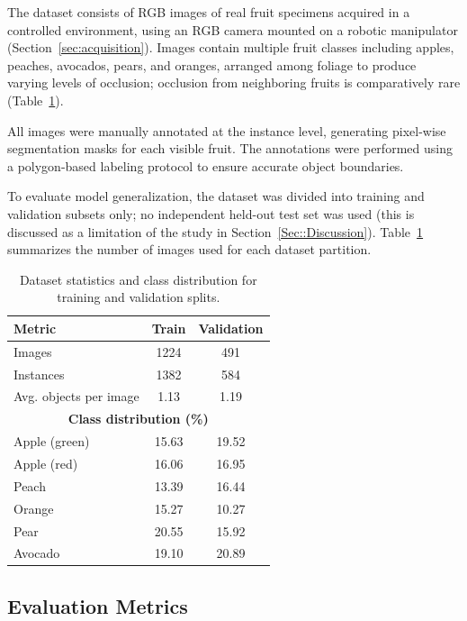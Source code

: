 \documentclass[runningheads]{llncs}
\begin{document}
The dataset consists of RGB images of real fruit specimens acquired in a
controlled environment, using an RGB camera mounted on a robotic manipulator
(Section~\ref{sec:acquisition}). Images contain multiple fruit
classes including apples, peaches, avocados, pears, and oranges, arranged among
foliage to produce varying levels of occlusion; occlusion from neighboring
fruits is comparatively rare (Table~\ref{tab:dataset_split}).

All images were manually annotated at the instance level, generating pixel-wise
segmentation masks for each visible fruit. The annotations were performed using
a polygon-based labeling protocol to ensure accurate object boundaries.

To evaluate model generalization, the dataset was divided into training and
validation subsets only; no independent held-out test set was used (this is
discussed as a limitation of the study in Section~\ref{Sec::Discussion}).
Table~\ref{tab:dataset_split} summarizes the
number of images used for each dataset partition.

\begin{table}[t]
\centering
\caption{Dataset statistics and class distribution for training and validation splits.}
\label{tab:dataset_split}
\setlength{\tabcolsep}{5pt}
\renewcommand{\arraystretch}{1.1}
\small
\begin{tabular}{lcc}
\hline
\textbf{Metric} & \textbf{Train} & \textbf{Validation} \\
\hline
Images & 1224 & 491 \\
Instances & 1382 & 584 \\
Avg. objects per image & 1.13 & 1.19 \\
\hline
\multicolumn{3}{c}{\textbf{Class distribution (\%)}} \\
\hline
Apple (green) & 15.63 & 19.52 \\
Apple (red)   & 16.06 & 16.95 \\
Peach         & 13.39 & 16.44 \\
Orange        & 15.27 & 10.27 \\
Pear          & 20.55 & 15.92 \\
Avocado       & 19.10 & 20.89 \\
\hline
\end{tabular}
\end{table}

\subsection{Evaluation Metrics}
\end{document}
